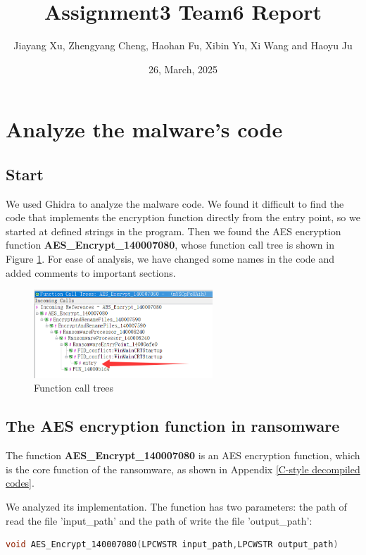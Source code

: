 \documentclass[11pt]{article}
\begin{document}
\title{\textbf{Assignment3 Team6 Report}}
\author{Jiayang Xu, Zhengyang Cheng, Haohan Fu, Xibin Yu, Xi Wang and Haoyu Ju}
\date{26, March, 2025}
\maketitle

\section{Analyze the malware's code}
\subsection{Start}
We used Ghidra to analyze the malware code. We found it difficult to find the code that implements the encryption function directly from the entry point, so we started at defined strings in the program. Then we found the AES encryption function \textbf{AES\_Encrypt\_140007080}, whose function call tree is shown in Figure \ref{Call Trees}. For ease of analysis, we have changed some names in the code and added comments to important sections. 

\begin{figure}[htbp]
    \centering
    \includegraphics[width=0.6\textwidth]{img/Call Trees.png}
    \caption{Function call trees}
    \label{Call Trees}
\end{figure}

\subsection{The AES encryption function in ransomware}
The function \textbf{AES\_Encrypt\_140007080} is an AES encryption function, which is the core function of the ransomware, as shown in Appendix \ref{C-style decompiled codes}.

We analyzed its implementation. The function has two parameters: the path of read the file 'input\_path' and the path of write the file 'output\_path':

\begin{lstlisting}[language=c++]
  void AES_Encrypt_140007080(LPCWSTR input_path,LPCWSTR output_path)
\end{lstlisting}
\end{document}
